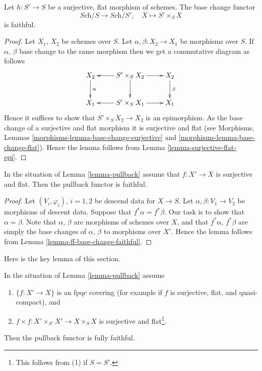\begin{lemma}
\label{lemma-ff-base-change-faithful}
Let $h : S' \to S$ be a surjective, flat morphism of
schemes. The base change functor
$$
\textit{Sch}/S \longrightarrow \textit{Sch}/S', \quad
X \longmapsto S' \times_S X
$$
is faithful.
\end{lemma}

\begin{proof}
Let $X_1$, $X_2$ be schemes over $S$.
Let $\alpha, \beta : X_2 \to X_1$ be morphisms over $S$.
If $\alpha$, $\beta$ base change to the same morphism then
we get a commutative diagram as follows
$$
\xymatrix{
X_2 \ar[d]^\alpha &
S' \times_S X_2 \ar[l] \ar[d] \ar[r] &
X_2 \ar[d]^\beta \\
X_1 &
S' \times_S X_1 \ar[l] \ar[r] &
X_1
}
$$
Hence it suffices to show that $S' \times_S X_2 \to X_2$
is an epimorphism. As the base change of a surjective and
flat morphism it is surjective and flat (see
Morphisms, Lemmas \ref{morphisms-lemma-base-change-surjective}
and \ref{morphisms-lemma-base-change-flat}). Hence the lemma follows
from Lemma \ref{lemma-surjective-flat-epi}.
\end{proof}

\begin{lemma}
\label{lemma-faithful}
In the situation of Lemma \ref{lemma-pullback}
assume that $f : X' \to X$ is surjective
and flat. Then the pullback functor is faithful.
\end{lemma}

\begin{proof}
Let $(V_i, \varphi_i)$, $i = 1, 2$ be descend data for $X \to S$.
Let $\alpha, \beta : V_1 \to V_2$ be morphisms of descent data.
Suppose that $f^*\alpha = f^*\beta$. Our task is to show that
$\alpha = \beta$. Note that $\alpha$, $\beta$ are morphisms
of schemes over $X$, and that $f^*\alpha$, $f^*\beta$ are
simply the base changes of $\alpha$, $\beta$ to morphisms over
$X'$. Hence the lemma follows from Lemma \ref{lemma-ff-base-change-faithful}.
\end{proof}

\noindent
Here is the key lemma of this section.

\begin{lemma}
\label{lemma-fully-faithful}
In the situation of Lemma \ref{lemma-pullback}
assume
\begin{enumerate}
\item $\{f : X' \to X\}$ is an fpqc covering (for example if $f$ is
surjective, flat, and quasi-compact), and
\item $f \times f : X' \times_{S'} X' \to X \times_S X$ is
surjective and flat\footnote{This follows from (1) if $S = S'$.}.
\end{enumerate}
Then the pullback functor is fully faithful.
\end{lemma}

